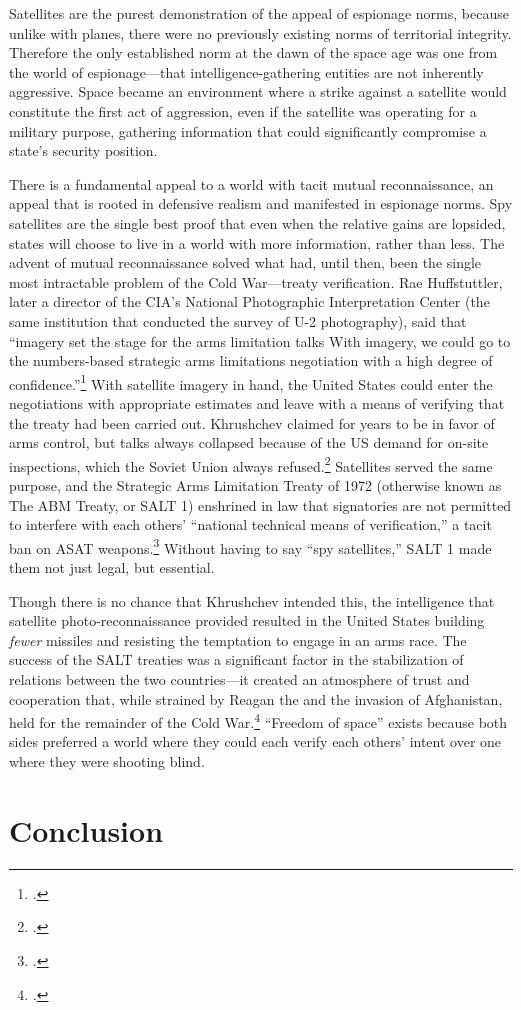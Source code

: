 \documentclass[14pt]{extarticle}
\begin{document}
Satellites are the purest demonstration of the appeal of espionage norms, because unlike with planes, there were no previously existing norms of territorial integrity. Therefore the only established norm at the dawn of the space age was one from the world of espionage---that intelligence-gathering entities are not inherently aggressive. Space became an environment where a strike against a satellite would constitute the first act of aggression, even if the satellite was operating for a military purpose, gathering information that could significantly compromise a state's security position.

There is a fundamental appeal to a world with tacit mutual reconnaissance, an appeal that is rooted in defensive realism and manifested in espionage norms. Spy satellites are the single best proof that even when the relative gains are lopsided, states will choose to live in a world with more information, rather than less. The advent of mutual reconnaissance solved what had, until then, been the single most intractable problem of the Cold War---treaty verification. Rae Huffstuttler, later a director of the CIA's National Photographic Interpretation Center (the same institution that conducted the survey of U-2 photography), said that ``imagery set the stage for the arms limitation talks \textelp{} With imagery, we could go to the numbers-based strategic arms limitations negotiation with a high degree of confidence.''\footcite[p.~403]{brugioni_eyes_2010} With satellite imagery in hand, the United States could enter the negotiations with appropriate estimates and leave with a means of verifying that the treaty had been carried out. Khrushchev claimed for years to be in favor of arms control, but talks always collapsed because of the US demand for on-site inspections, which the Soviet Union always refused.\footcite[p.~255]{mcdougall_heavens_1985} Satellites served the same purpose, and the Strategic Arms Limitation Treaty of 1972 (otherwise known as The ABM Treaty, or SALT 1) enshrined in law that signatories are not permitted to interfere with each others' ``national technical means of verification,'' a tacit ban on ASAT weapons.\footcite[p.~431]{mcdougall_heavens_1985} Without having to say ``spy satellites,'' SALT 1 made them not just legal, but essential.

Though there is no chance that Khrushchev intended this, the intelligence that satellite photo-reconnaissance provided resulted in the United States building \emph{fewer} missiles and resisting the temptation to engage in an arms race. The success of the SALT treaties was a significant factor in the stabilization of relations between the two countries---it created an atmosphere of trust and cooperation that, while strained by Reagan the and the invasion of Afghanistan, held for the remainder of the Cold War.\footcite[p.~179]{lindgren_trust_2000} ``Freedom of space'' exists because both sides preferred a world where they could each verify each others' intent over one where they were shooting blind.

\section{Conclusion}
\end{document}

